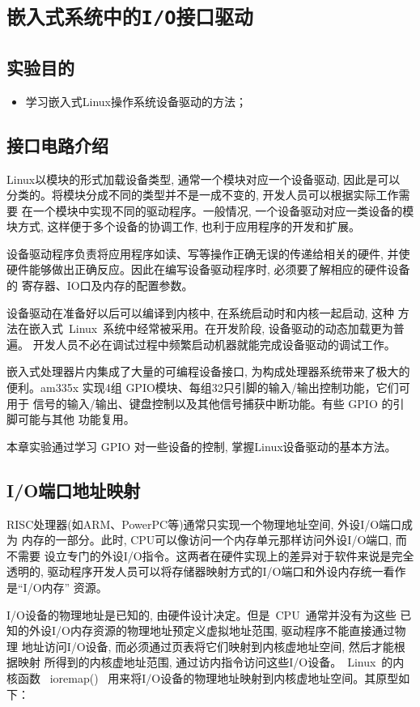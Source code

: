 \chapter{\tt 嵌入式系统中的I/O接口驱动}
\section{实验目的}
\begin{itemize}\itemsep=-3pt
  \item 学习嵌入式Linux操作系统设备驱动的方法；
\end{itemize}

\section{接口电路介绍}
	Linux以模块的形式加载设备类型, 通常一个模块对应一个设备驱动, 因此是可以
分类的。将模块分成不同的类型并不是一成不变的, 开发人员可以根据实际工作需要
在一个模块中实现不同的驱动程序。一般情况, 一个设备驱动对应一类设备的模块方式, 
这样便于多个设备的协调工作, 也利于应用程序的开发和扩展。

	设备驱动程序负责将应用程序如读、写等操作正确无误的传递给相关的硬件, 并使
硬件能够做出正确反应。因此在编写设备驱动程序时, 必须要了解相应的硬件设备的
寄存器、IO口及内存的配置参数。

	设备驱动在准备好以后可以编译到内核中, 在系统启动时和内核一起启动, 这种
方法在嵌入式~Linux~系统中经常被采用。在开发阶段, 设备驱动的动态加载更为普遍。
开发人员不必在调试过程中频繁启动机器就能完成设备驱动的调试工作。

	嵌入式处理器片内集成了大量的可编程设备接口, 为构成处理器系统带来了极大的
便利。am335x 实现4组 GPIO模块、每组32只引脚的输入/输出控制功能，它们可用于
信号的输入/输出、键盘控制以及其他信号捕获中断功能。有些 GPIO 的引脚可能与其他
功能复用。

	本章实验通过学习 GPIO 对一些设备的控制, 掌握Linux设备驱动的基本方法。

\section{I/O端口地址映射}
	RISC处理器(如ARM、PowerPC等)通常只实现一个物理地址空间, 外设I/O端口成为
内存的一部分。此时, CPU可以像访问一个内存单元那样访问外设I/O端口, 而不需要
设立专门的外设I/O指令。这两者在硬件实现上的差异对于软件来说是完全透明的, 
驱动程序开发人员可以将存储器映射方式的I/O端口和外设内存统一看作是``I/O内存''
资源。

	I/O设备的物理地址是已知的, 由硬件设计决定。但是~CPU~通常并没有为这些
已知的外设I/O内存资源的物理地址预定义虚拟地址范围, 驱动程序不能直接通过物理
地址访问I/O设备, 而必须通过页表将它们映射到内核虚地址空间, 然后才能根据映射
所得到的内核虚地址范围, 通过访内指令访问这些I/O设备。~Linux~的内核函数
~ioremap()~ 用来将I/O设备的物理地址映射到内核虚地址空间。其原型如下：

